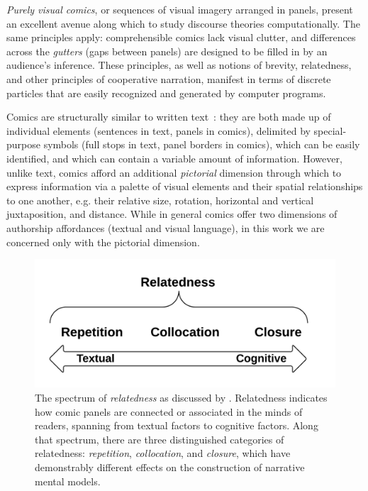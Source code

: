 
{\em Purely visual comics}, or sequences of visual imagery arranged in
panels, present an excellent avenue along which to study discourse
theories computationally. 
The same principles apply: comprehensible comics
lack visual clutter, and differences across the {\em gutters} (gaps between
panels) are designed to be filled in by an audience's inference. 
These principles, as well as notions of brevity, relatedness, and other
principles of cooperative narration, manifest in terms of discrete
particles that are easily recognized and generated by computer programs. 

Comics are structurally similar to written
text~\cite{saraceni2016relatedness}: they are both made up of individual
elements (sentences in text, panels in comics), delimited by special-purpose
symbols (full stops in text, panel borders in comics), which can be easily
identified, and which can contain a variable amount of information. However,
unlike text, comics afford an additional \emph{pictorial} dimension through
which to express information via a palette of visual elements and their spatial
relationships to one another, e.g. their relative size, rotation, horizontal and
vertical juxtaposition, and distance. While in general comics offer two
dimensions of authorship affordances (textual and visual language), in this work
we are concerned only with the pictorial dimension.
%
\begin{figure}
	\includegraphics[width=\columnwidth]{relatedness.png}
	\caption{
		The spectrum of \emph{relatedness} as discussed by
		. Relatedness indicates how 
		comic panels are connected or associated in the minds of 
		readers, spanning from textual factors to cognitive factors. 
		Along that spectrum, there are three  distinguished 
		categories of relatedness: \emph{repetition}, 
		\emph{collocation}, and \emph{closure}, which have
		demonstrably different effects on the construction of
		narrative mental models.
		}
	\label{figure:relatedness}
\end{figure}

